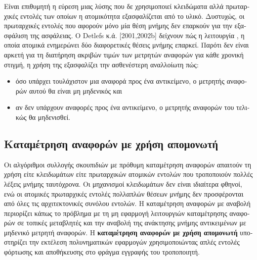\begin{greek}
Είναι επιθυμητή η εύρεση μιας λύσης που δε χρησιμοποιεί κλειδώματα αλλά πρωταρχικές εντολές
των οποίων η ατομικότητα εξασφαλίζεται από το υλικό. Δυστυχώς, οι πρωταρχικές 
εντολές που αφορούν μόνο μία θέση μνήμης δεν επαρκούν για την εξασφάλιση της ασφάλειας.
Ο Detlefs κ.ά. \cite{DBLP:conf/podc/DetlefsMMS01} [2001,2002b] δείχνουν πώς η λειτουργία \textenglish{}, η οποία
ατομικά ενημερώνει δύο διαφορετικές θέσεις μνήμης επαρκεί. Παρότι δεν είναι αρκετή για τη διατήρηση
ακριβών τιμών των μετρητών αναφορών για κάθε χρονική στιγμή, η χρήση της εξασφαλίζει την ασθενέστερη
αναλλοίωτη πώς:
\begin{itemize}
\item όσο υπάρχει τουλάχιστον μια αναφορά προς ένα αντικείμενο, ο μετρητής αναφορών αυτού θα είναι
μη μηδενικός και
\item αν δεν υπάρχουν αναφορές προς ένα αντικείμενο, ο μετρητής αναφορών του τελικώς θα μηδενισθεί.
\end{itemize}

\subsection{Καταμέτρηση αναφορών με χρήση απομονωτή}
Οι αλγόριθμοι συλλογής σκουπιδιών με πρόθυμη καταμέτρηση
αναφορών απαιτούν τη χρήση είτε κλειδωμάτων είτε πρωταρχικών
ατομικών εντολών που τροποποιούν πολλές λέξεις μνήμης
ταυτόχρονα. Οι μηχανισμοί κλειδωμάτων δεν είναι ιδιαίτερα
φθηνοί, ενώ οι ατομικές πρωταρχικές εντολές πολλαπλών θέσεων
μνήμης δεν προσφέρονται από όλες τις αρχιτεκτονικές συνόλου
εντολών. Η καταμέτρηση αναφορών με αναβολή περιορίζει κάπως
το πρόβλημα με τη μη εφαρμογή λειτουργιών καταμέτρησης αναφορών
σε τοπικές μεταβλητές και την αναβολή της ανάκτησης μνήμης
αντικειμένων με μηδενικό μετρητή αναφορών. H
\textbf{καταμέτρηση αναφορών με χρήση απομονωτή} υποστηρίζει
την εκτέλεση πολυνηματικών εφαρμογών χρησιμοποιώντας απλές
εντολές φόρτωσης και αποθήκευσης στο φράγμα εγγραφής του
τροποποιητή.


\end{greek}

